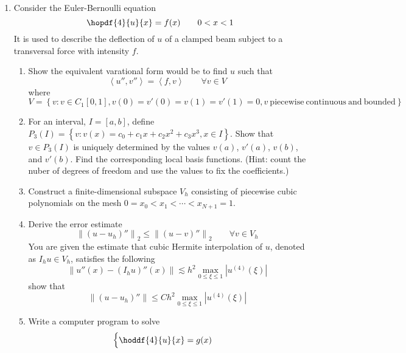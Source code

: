 \documentclass{article}
\begin{document}
\begin{enumerate}
	\item Consider the Euler-Bernoulli equation
		\begin{equation*}
			\hopdf{4}{u}{x} = f(x) \qquad 0 < x < 1
		\end{equation*}
		It is used to describe the deflection of $u$ of a clamped beam
		subject to a transversal force with intensity $f$.
		\begin{enumerate}
			\item Show the equivalent varational form would be to find $u$ such that
				\begin{equation*}
					\left<u'',v''\right> = \left<f,v\right> \qquad \forall v \in V
				\end{equation*}
				where $V = \left\{v:v\in C_1[0,1],v(0)=v'(0)=v(1)=v'(1)=0,
					v\mathrm{\ piecewise\ continuous\ and\ bounded}\right\}$
			\item For an interval, $I = [a,b]$, define $P_3(I) =
				\left\{v:v(x) = c_0 + c_1 x + c_2 x^2 + c_3 x^3, x \in I\right\}$.
				Show that $v \in P_3(I)$ is uniquely determined by the values
				$v(a)$, $v'(a)$, $v(b)$, and $v'(b)$.
				Find the corresponding local basis functions.
				(Hint: count the nuber of degrees of freedom and use the values to fix the coefficients.)
			\item Construct a finite-dimensional subspace $V_h$ consisting of
				piecewise cubic polynomials on the mesh $0 = x_0 < x_1 < \cdots < x_{N+1} = 1$.
			\item Derive the error estimate
				\begin{equation*}
					\left\|\left(u - u_h\right)''\right\|_2 \leq \left\|\left(u - v\right)''\right\|_2
						\qquad \forall v \in V_h
				\end{equation*}
				You are given the estimate that cubic Hermite interpolation of $u$,
				denoted as $I_h u \in V_h$, satisfies the following
				\begin{equation*}
					\left\|u''(x) - \left(I_h u\right)''(x)\right\| \lesssim
						h^2\max_{0\leq\xi\leq 1}\left|u^{(4)}(\xi)\right|
				\end{equation*}
				show that
				\begin{equation*}
					\left\|\left(u - u_h\right)''\right\| \leq
						Ch^2\max_{0\leq\xi\leq 1}\left|u^{(4)}(\xi)\right|
				\end{equation*}
			\item Write a computer program to solve
				\begin{equation*}
					\begin{cases}
						\displaystyle\hoddf{4}{u}{x} = g(x) \\

\end{cases}
\end{equation*}
\end{enumerate}
\end{enumerate}
\end{document}

